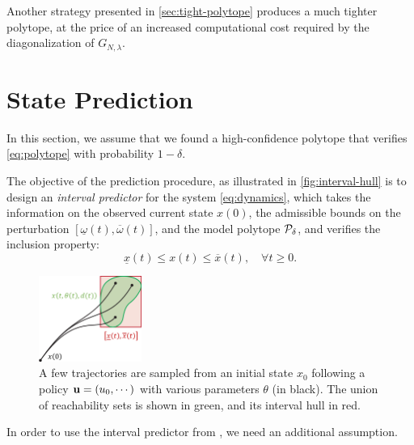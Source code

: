 \documentclass{article}
\begin{document}
Another strategy presented in \autoref{sec:tight-polytope} produces a much tighter polytope, at the price of an increased computational cost required by the diagonalization of $G_{N,\lambda}$.

\section{State Prediction}

\label{sec:prediction}

In this section, we assume that we found a high-confidence polytope that verifies \eqref{eq:polytope} with probability $1-\delta$.

The objective of the prediction procedure, as illustrated in \autoref{fig:interval-hull} is to design an \emph{interval predictor} for the system \eqref{eq:dynamics}, which takes the information on the observed current state ${x}({0})$, the admissible bounds on the perturbation $[\underline{\omega}(t),\overline{\omega}(t)]$, and the model polytope $\mathcal{P}_\delta$, and verifies the inclusion property:
\begin{equation}
\label{eq:interval_property}
\underline{x}(t)\leq x(t)\leq\overline{x}(t),\quad\forall t\geq0.
\end{equation}

\begin{figure}
    \centering
    \includegraphics[width=0.3\textwidth]{img/interval-hull}
    \caption{A few trajectories are sampled from an initial state $x_0$ following a policy $\mathbf{u}=(u_0,\cdots)$ with various parameters $\theta$ (in black). The union of reachability sets is shown in green, and its interval hull in red.}
    \label{fig:interval-hull}
\end{figure}

In order to use the interval predictor from \citep{leurent2019interval}, we need an additional assumption.

\end{document}
